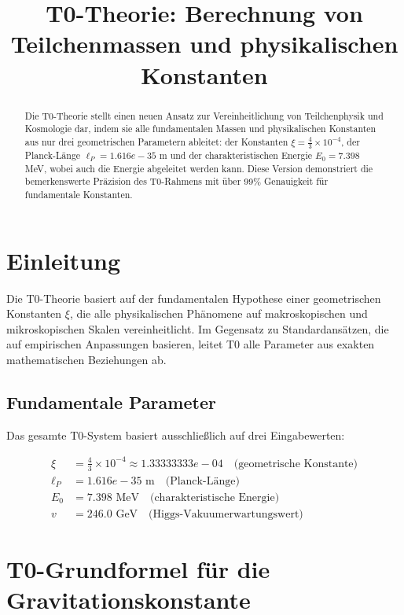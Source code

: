 \documentclass[12pt,a4paper]{report}
\title{\textbf{T0-Theorie: Berechnung von Teilchenmassen und physikalischen Konstanten}}
\author{}
\date{}
\begin{document}
	
	\maketitle
	
	\begin{abstract}
		Die T0-Theorie stellt einen neuen Ansatz zur Vereinheitlichung von Teilchenphysik und Kosmologie dar, indem sie alle fundamentalen Massen und physikalischen Konstanten aus nur drei geometrischen Parametern ableitet: der Konstanten $\xi = \frac{4}{3} \times 10^{-4}$, der Planck-Länge $\ell_P = 1.616e-35$ m und der charakteristischen Energie $E_0 = 7.398$ MeV, wobei auch die Energie abgeleitet werden kann. Diese Version demonstriert die bemerkenswerte Präzision des T0-Rahmens mit über 99\% Genauigkeit für fundamentale Konstanten.
	\end{abstract}
	
	\tableofcontents
	
	\section{Einleitung}
	
	Die T0-Theorie basiert auf der fundamentalen Hypothese einer geometrischen Konstanten $\xi$, die alle physikalischen Phänomene auf makroskopischen und mikroskopischen Skalen vereinheitlicht. Im Gegensatz zu Standardansätzen, die auf empirischen Anpassungen basieren, leitet T0 alle Parameter aus exakten mathematischen Beziehungen ab.
	
	\subsection{Fundamentale Parameter}
	
	Das gesamte T0-System basiert ausschließlich auf drei Eingabewerten:
	
	\begin{align}
		\xi &= \frac{4}{3} \times 10^{-4} \approx 1.33333333e-04 \quad \text{(geometrische Konstante)} \\
		\ell_P &= 1.616e-35 \text{ m} \quad \text{(Planck-Länge)} \\
		E_0 &= 7.398 \text{ MeV} \quad \text{(charakteristische Energie)} \\
		v &= 246.0 \text{ GeV} \quad \text{(Higgs-Vakuumerwartungswert)}
	\end{align}
	
	\section{T0-Grundformel für die Gravitationskonstante}
	
\end{document}
